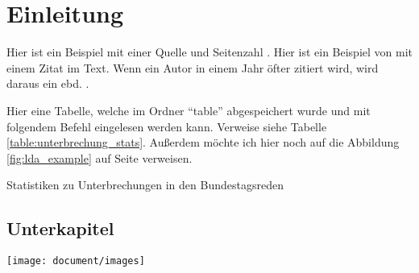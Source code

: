 \documentclass[12pt, twoside = false, bibliography = totoc, numbers = endperiod, headings = normal]{scrbook}
\begin{document}


\frontmatter

\tableofcontents

\listoffigures
{}
\vspace*{24pt}
{\let\clearpage\relax \listoftables}	

\mainmatter

\chapter{Einleitung}\label{Einleitung} %

Hier ist ein Beispiel mit einer Quelle und Seitenzahl \parencite[S. 103]{wangnerud_2009}. Hier ist ein Beispiel von \textcite{erikson_2018} mit einem Zitat im Text. Wenn ein Autor in einem Jahr öfter zitiert wird, wird daraus ein ebd. \parencite{erikson_2018}.

Hier eine Tabelle, welche im Ordner \enquote{table} abgespeichert wurde und mit folgendem Befehl eingelesen werden kann. Verweise siehe Tabelle \ref{table:unterbrechung_stats}. Außerdem möchte ich hier noch auf die Abbildung \ref{fig:lda_example} auf Seite \pageref{fig:lda_example} verweisen. 

\begin{table}[htb]
\centering
\caption{Statistiken zu Unterbrechungen in den Bundestagsreden}

\label{table:unterbrechung_stats}
\end{table}

\Blindtext

\section{Unterkapitel}

\blindtext

\texttt{[image: document/images]}


\setlength{\parskip}{8pt}
\printbibliography[title={Literaturverzeichnis}]
\end{document}

